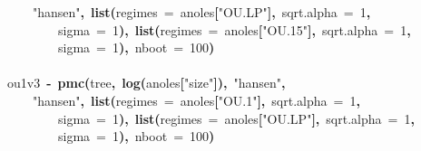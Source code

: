 \documentclass{elsarticle}
\makeatletter
\newcommand{\hlnumber}[1]{\textcolor[rgb]{0,0,0}{#1}}%
\newcommand{\hlfunctioncall}[1]{\textcolor[rgb]{.5,0,.33}{\textbf{#1}}}%
\newcommand{\hlstring}[1]{\textcolor[rgb]{.6,.6,1}{#1}}%
\newcommand{\hlkeyword}[1]{\textbf{#1}}%
\newcommand{\hlargument}[1]{\textcolor[rgb]{.69,.25,.02}{#1}}%
\newcommand{\hlassignement}[1]{\textbf{#1}}%
\newcommand{\hlsymbol}[1]{#1}%
\newcommand{\hlstd}[1]{\textcolor[rgb]{0,0,0}{#1}}%
\newenvironment{kframe}{%
 \def\FrameCommand##1{\hskip\@totalleftmargin \hskip-\fboxsep
 \colorbox{shadecolor}{##1}\hskip-\fboxsep
     \hskip-\linewidth \hskip-\@totalleftmargin \hskip\columnwidth}%
 \MakeFramed {\advance\hsize-\width
   \@totalleftmargin\z@ \linewidth\hsize
   \@setminipage}}%
 {\par\unskip\endMakeFramed}
\newenvironment{knitrout}{}{} %
\makeatother
\begin{document}
\begin{knitrout}
{\begin{kframe}
\begin{flushleft}
\hlstd{}{\ }{\ }{\ }{\ }\hlstring{"{}hansen"{}}\hlkeyword{,}{\ }\hlfunctioncall{list}\hlkeyword{(}\hlargument{regimes}{\ }\hlargument{=}{\ }\hlsymbol{anoles}\hlkeyword{[}\hlstring{"{}OU.LP"{}}\hlkeyword{]}\hlkeyword{,}{\ }\hlargument{sqrt.alpha}{\ }\hlargument{=}{\ }\hlnumber{1}\hlkeyword{,}\hspace*{\fill}\\
\hlstd{}{\ }{\ }{\ }{\ }{\ }{\ }{\ }{\ }\hlargument{sigma}{\ }\hlargument{=}{\ }\hlnumber{1}\hlkeyword{)}\hlkeyword{,}{\ }\hlfunctioncall{list}\hlkeyword{(}\hlargument{regimes}{\ }\hlargument{=}{\ }\hlsymbol{anoles}\hlkeyword{[}\hlstring{"{}OU.15"{}}\hlkeyword{]}\hlkeyword{,}{\ }\hlargument{sqrt.alpha}{\ }\hlargument{=}{\ }\hlnumber{1}\hlkeyword{,}\hspace*{\fill}\\
\hlstd{}{\ }{\ }{\ }{\ }{\ }{\ }{\ }{\ }\hlargument{sigma}{\ }\hlargument{=}{\ }\hlnumber{1}\hlkeyword{)}\hlkeyword{,}{\ }\hlargument{nboot}{\ }\hlargument{=}{\ }\hlnumber{100}\hlkeyword{)}\hspace*{\fill}\\
\hlstd{}\hspace*{\fill}\\
\hlstd{}\hlsymbol{ou1v3}{\ }\hlassignement{\usebox{\hlnormalsizeboxlessthan}-}{\ }\hlfunctioncall{pmc}\hlkeyword{(}\hlsymbol{tree}\hlkeyword{,}{\ }\hlfunctioncall{log}\hlkeyword{(}\hlsymbol{anoles}\hlkeyword{[}\hlstring{"{}size"{}}\hlkeyword{]}\hlkeyword{)}\hlkeyword{,}{\ }\hlstring{"{}hansen"{}}\hlkeyword{,}\hspace*{\fill}\\
\hlstd{}{\ }{\ }{\ }{\ }\hlstring{"{}hansen"{}}\hlkeyword{,}{\ }\hlfunctioncall{list}\hlkeyword{(}\hlargument{regimes}{\ }\hlargument{=}{\ }\hlsymbol{anoles}\hlkeyword{[}\hlstring{"{}OU.1"{}}\hlkeyword{]}\hlkeyword{,}{\ }\hlargument{sqrt.alpha}{\ }\hlargument{=}{\ }\hlnumber{1}\hlkeyword{,}\hspace*{\fill}\\
\hlstd{}{\ }{\ }{\ }{\ }{\ }{\ }{\ }{\ }\hlargument{sigma}{\ }\hlargument{=}{\ }\hlnumber{1}\hlkeyword{)}\hlkeyword{,}{\ }\hlfunctioncall{list}\hlkeyword{(}\hlargument{regimes}{\ }\hlargument{=}{\ }\hlsymbol{anoles}\hlkeyword{[}\hlstring{"{}OU.LP"{}}\hlkeyword{]}\hlkeyword{,}{\ }\hlargument{sqrt.alpha}{\ }\hlargument{=}{\ }\hlnumber{1}\hlkeyword{,}\hspace*{\fill}\\
\hlstd{}{\ }{\ }{\ }{\ }{\ }{\ }{\ }{\ }\hlargument{sigma}{\ }\hlargument{=}{\ }\hlnumber{1}\hlkeyword{)}\hlkeyword{,}{\ }\hlargument{nboot}{\ }\hlargument{=}{\ }\hlnumber{100}\hlkeyword{)}\hspace*{\fill}\\

\end{flushleft}
\end{kframe}}
\end{knitrout}
\end{document}
